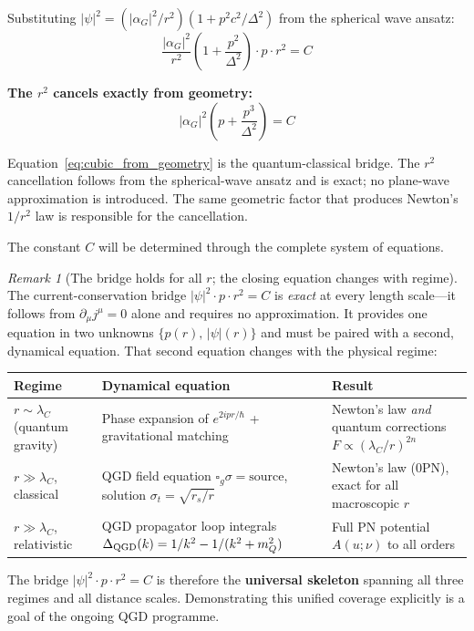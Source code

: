 \documentclass[11pt,a4paper]{article}
\theoremstyle{definition}
\theoremstyle{remark}
\newtheorem{remark}{Remark}[section]
\begin{document}
	Substituting $|\psi|^2 = (|\alpha_G|^2/r^2)(1 + p^2c^2/\Delta^2)$ from the spherical wave ansatz:
	\begin{equation}
		\frac{|\alpha_G|^2}{r^2}\!\left(1 + \frac{p^2}{\Delta^2}\right)\cdot p \cdot r^2 = C
	\end{equation}
	
	\textbf{The $r^2$ cancels exactly from geometry:}
	\begin{equation}
		\boxed{|\alpha_G|^2\!\left(p + \frac{p^3}{\Delta^2}\right) = C}
		\label{eq:cubic_from_geometry}
	\end{equation}
	
	Equation~\eqref{eq:cubic_from_geometry} is the quantum-classical bridge.  The $r^2$ cancellation follows from the spherical-wave ansatz and is exact; no plane-wave approximation is introduced.  The same geometric factor that produces Newton's $1/r^2$ law is responsible for the cancellation.
	
	The constant $C$ will be determined through the complete system of equations.

	\begin{remark}[The bridge holds for all $r$; the closing equation changes with regime]
	\label{rem:regimes}
	The current-conservation bridge $|\psi|^2\cdot p\cdot r^2 = C$ is \emph{exact} at every
	length scale---it follows from $\partial_\mu j^\mu = 0$ alone and requires no
	approximation.  It provides one equation in two unknowns $\{p(r),\,|\psi|(r)\}$
	and must be paired with a second, dynamical equation.  That second equation changes
	with the physical regime:
	\begin{center}
	\renewcommand{\arraystretch}{1.4}
	\begin{tabular}{@{}p{3cm}p{4.2cm}p{6cm}@{}}
	\hline
	\textbf{Regime} & \textbf{Dynamical equation} & \textbf{Result} \\
	\hline
	$r\sim\lambda_C$ (quantum gravity) &
	  Phase expansion of $e^{2ipr/\hbar}$ + gravitational matching &
	  Newton's law \emph{and} quantum corrections $F\propto(\lambda_C/r)^{2n}$ \\[4pt]
	$r\gg\lambda_C$, classical &
	  QGD field equation $\square_g\sigma=\text{source}$, \newline solution $\sigma_t=\sqrt{r_s/r}$ &
	  Newton's law (0PN), exact for all macroscopic $r$ \\[4pt]
	$r\gg\lambda_C$, relativistic &
	  QGD propagator loop integrals \newline $\Delta_{\rm QGD}(k)=1/k^2-1/(k^2+m_Q^2)$ &
	  Full PN potential $A(u;\nu)$ to all orders \\
	\hline
	\end{tabular}
	\end{center}
	The bridge $|\psi|^2\cdot p\cdot r^2=C$ is therefore the \textbf{universal skeleton}
	spanning all three regimes and all distance scales.  Demonstrating this unified
	coverage explicitly is a goal of the ongoing QGD programme.
	\end{remark}
	
\end{document}

